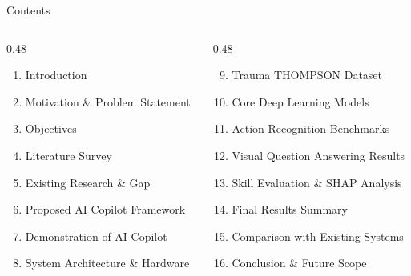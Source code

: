 \documentclass[aspectratio=169, 10pt]{beamer}
\begin{document}
\begin{frame}{Contents}
    \vspace{0.2cm}
    \begin{columns}[t]
        \begin{column}{0.48\textwidth}
            \begin{enumerate}
                \setlength{\itemsep}{6pt}
                \item Introduction
                \item Motivation \& Problem Statement
                \item Objectives
                \item Literature Survey
                \item Existing Research \& Gap
                \item Proposed AI Copilot Framework 
                \item Demonstration of AI Copilot 
                \item System Architecture \& Hardware
            \end{enumerate}
        \end{column}
        \begin{column}{0.48\textwidth}
            \begin{enumerate}
                \setcounter{enumi}{8}
                \setlength{\itemsep}{6pt}
                \item Trauma THOMPSON Dataset
                \item Core Deep Learning Models
                \item Action Recognition Benchmarks 
                \item Visual Question Answering Results
                \item Skill Evaluation \& SHAP Analysis 
                \item Final Results Summary
                \item Comparison with Existing Systems
                \item Conclusion \& Future Scope
            \end{enumerate}
        \end{column}
    \end{columns}
\end{frame}
\end{document}
